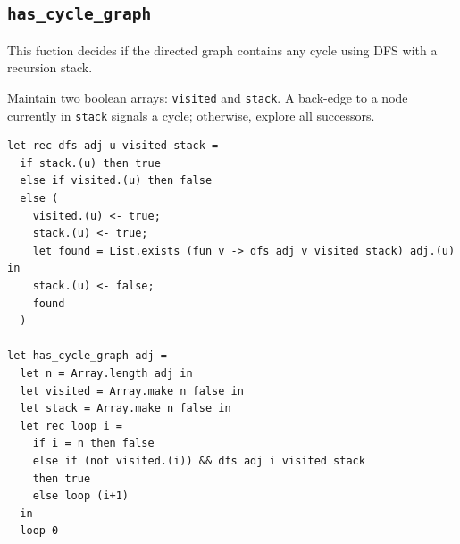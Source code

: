 \subsection{\texttt{has\_cycle\_graph}}
This fuction decides if the directed graph contains any cycle using DFS with a recursion stack. 

Maintain two boolean arrays: \texttt{visited} and \texttt{stack}. A back-edge to a node currently in \texttt{stack} signals a cycle; otherwise, explore all 
successors. 

\begin{verbatim}
let rec dfs adj u visited stack =
  if stack.(u) then true
  else if visited.(u) then false
  else (
    visited.(u) <- true;
    stack.(u) <- true;
    let found = List.exists (fun v -> dfs adj v visited stack) adj.(u) in
    stack.(u) <- false;
    found
  )

let has_cycle_graph adj =
  let n = Array.length adj in
  let visited = Array.make n false in
  let stack = Array.make n false in
  let rec loop i =
    if i = n then false
    else if (not visited.(i)) && dfs adj i visited stack
    then true
    else loop (i+1)
  in
  loop 0
\end{verbatim}
